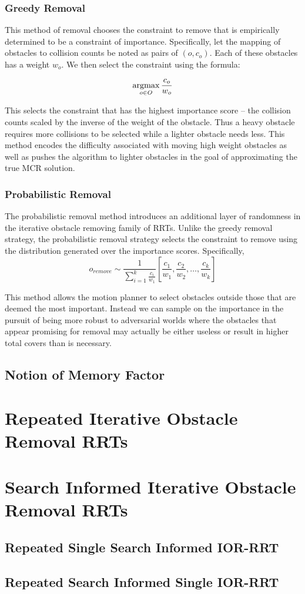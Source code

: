 \subsubsection{Greedy Removal}
This method of removal chooses the constraint to remove that is empirically determined to be a constraint of importance. Specifically, let the mapping of obstacles to collision counts be noted as pairs of $(o, c_o)$. Each of these obstacles has a weight $w_o$. We then select the constraint using the formula:

$$\operatorname*{argmax}\limits_{o \in O} \frac{c_o}{w_o}$$

This selects the constraint that has the highest importance score -- the collision counts scaled by the inverse of the weight of the obstacle. Thus a heavy obstacle requires more collisions to be selected while a lighter obstacle needs less. This method encodes the difficulty associated with moving high weight obstacles as well as pushes the algorithm to lighter obstacles in the goal of approximating the true MCR solution.


\subsubsection{Probabilistic Removal}
The probabilistic removal method introduces an additional layer of randomness in the iterative obstacle removing family of RRTs. Unlike the greedy removal strategy, the probabilistic removal strategy selects the constraint to remove using the distribution generated over the importance scores. Specifically,
$$o_{remove} \sim \frac{1}{\sum_{i=1}^k \frac{c_i}{w_1}}[\frac{c_1}{w_1}, \frac{c_2}{w_2},\ldots, \frac{c_k}{w_k}]$$

This method allows the motion planner to select obstacles outside those that are deemed the most important. Instead we can sample on the importance in the pursuit of being more robust to adversarial worlds where the obstacles that appear promising for removal may actually be either useless or result in higher total covers than is necessary. 

\subsection{Notion of Memory Factor}


\section{Repeated Iterative Obstacle Removal RRTs}

\section{Search Informed Iterative Obstacle Removal RRTs}

\subsection{Repeated Single Search Informed IOR-RRT}

\subsection{Repeated Search Informed Single IOR-RRT}





